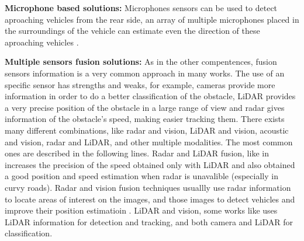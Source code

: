\textbf{Microphone based solutions:}
Microphones sensors can be used to detect aproaching vehicles from the rear side, an array of multiple microphones placed in the surroundings of the vehicle can estimate even the direction of these aproaching vehicles \cite{mizumachi2014robust}.


\textbf{Multiple sensors fusion solutions:}
As in the other compentences, fusion sensors information is a very common approach in many works. The use of an specific sensor has strengths and weaks, for example, cameras provide more information in order to do a better classification of the obstacle, LiDAR provides a very precise position of the obstacle in a large range of view and radar gives information of the obstacle's speed, making easier tracking them.
There exists many different combinations, like radar and vision, LiDAR and vision, acoustic and vision, radar and LiDAR, and other multiple modalities. The most common ones are described in the following lines.
Radar and LiDAR fusion, like in \cite{gohring2011radar} increases the precision of the speed obtained only with LiDAR and also obtained a good position and speed estimation when radar is unavalible (especially in curvy roads).
Radar and vision fusion techniques usuallly use radar information to locate areas of interest on the images, and those images to detect vehicles and improve their position estimatioin \cite{alessandretti2007vehicle}.
LiDAR and vision, some works like \cite{premebida2007lidar} uses LiDAR information for detection and tracking, and both camera and LiDAR for classification.





